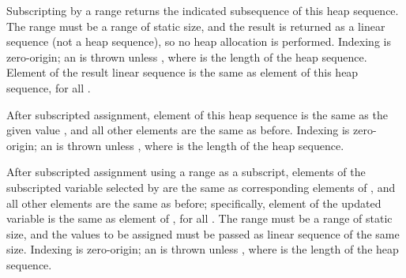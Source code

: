 
Subscripting by a range returns the indicated subsequence of this heap sequence.
The range must be a range of static size, and the result is returned as a linear sequence
(not a heap sequence), so no heap allocation is performed.
Indexing is zero-origin; an  is thrown unless ,
where  is the length of the heap sequence.
Element  of the result linear sequence is the same as
element  of this heap sequence, for all .



After subscripted assignment, element  of this heap sequence is the same as the given value ,
and all other elements are the same as before.
Indexing is zero-origin; an  is thrown unless ,
where  is the length of the heap sequence.



After subscripted assignment using a range as a subscript, elements of the subscripted variable selected by 
are the same as corresponding elements of , and all other elements are the same as before;
specifically, element  of the updated
variable is the same as element  of , for all .
The range must be a range of static size, and the values to be assigned
must be passed as linear sequence of the same size.
Indexing is zero-origin; an  is thrown unless ,
where  is the length of the heap sequence.


